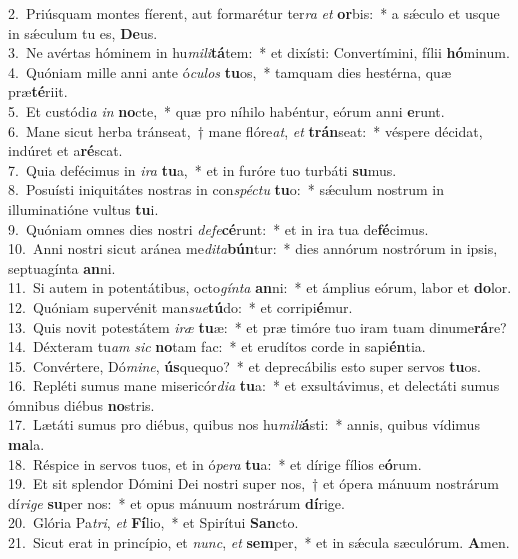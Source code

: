 {2.~}Priúsquam montes fíerent, aut formarétur ter\textit{ra} \textit{et} \textbf{or}bis:~* a sǽculo et usque in sǽculum tu es, \textbf{De}us.\\
{3.~}Ne avértas hóminem in hu\textit{mi}\textit{li}\textbf{tá}tem:~* et dixísti: Convertímini, fílii \textbf{hó}minum.\\
{4.~}Quóniam mille anni ante ó\textit{cu}\textit{los} \textbf{tu}os,~* tamquam dies hestérna, quæ præ\textbf{té}riit.\\
{5.~}Et custódi\textit{a} \textit{in} \textbf{no}cte,~* quæ pro níhilo habéntur, eórum anni \textbf{e}runt.\\
{6.~}Mane sicut herba tránseat,~† mane flóre\textit{at}, \textit{et} \textbf{trán}seat:~* véspere décidat, indúret et a\textbf{ré}scat.\\
{7.~}Quia defécimus in \textit{i}\textit{ra} \textbf{tu}a,~* et in furóre tuo turbáti \textbf{su}mus.\\
{8.~}Posuísti iniquitátes nostras in con\textit{spé}\textit{ctu} \textbf{tu}o:~* sǽculum nostrum in illuminatióne vultus \textbf{tu}i.\\
{9.~}Quóniam omnes dies nostri \textit{de}\textit{fe}\textbf{cé}runt:~* et in ira tua de\textbf{fé}cimus.\\
{10.~}Anni nostri sicut aránea me\textit{di}\textit{ta}\textbf{bún}tur:~* dies annórum nostrórum in ipsis, septuagínta \textbf{an}ni.\\
{11.~}Si autem in potentátibus, octo\textit{gín}\textit{ta} \textbf{an}ni:~* et ámplius eórum, labor et \textbf{do}lor.\\
{12.~}Quóniam supervénit man\textit{su}\textit{e}\textbf{tú}do:~* et corripi\textbf{é}mur.\\
{13.~}Quis novit potestátem \textit{i}\textit{ræ} \textbf{tu}æ:~* et præ timóre tuo iram tuam dinume\textbf{rá}re?\\
{14.~}Déxteram tu\textit{am} \textit{sic} \textbf{no}tam fac:~* et erudítos corde in sapi\textbf{én}tia.\\
{15.~}Convértere, Dó\textit{mi}\textit{ne}, \textbf{ús}quequo?~* et deprecábilis esto super servos \textbf{tu}os.\\
{16.~}Repléti sumus mane misericór\textit{di}\textit{a} \textbf{tu}a:~* et exsultávimus, et delectáti sumus ómnibus diébus \textbf{no}stris.\\
{17.~}Lætáti sumus pro diébus, quibus nos hu\textit{mi}\textit{li}\textbf{á}sti:~* annis, quibus vídimus \textbf{ma}la.\\
{18.~}Réspice in servos tuos, et in ó\textit{pe}\textit{ra} \textbf{tu}a:~* et dírige fílios e\textbf{ó}rum.\\
{19.~}Et sit splendor Dómini Dei nostri super nos,~† et ópera mánuum nostrárum dí\textit{ri}\textit{ge} \textbf{su}per nos:~* et opus mánuum nostrárum \textbf{dí}rige.\\
{20.~}Glória Pa\textit{tri}, \textit{et} \textbf{Fí}lio,~* et Spirítui \textbf{San}cto.\\
{21.~}Sicut erat in princípio, et \textit{nunc}, \textit{et} \textbf{sem}per,~* et in sǽcula sæculórum. \textbf{A}men.\\
